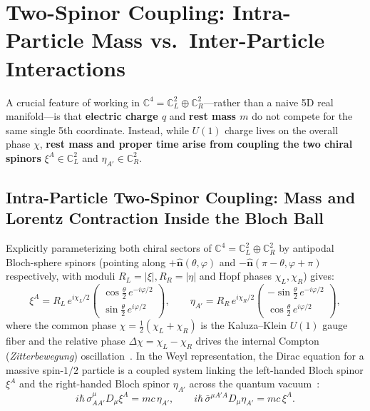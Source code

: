 \documentclass[11pt,a4paper]{article}
\begin{document}
\section{Two-Spinor Coupling: Intra-Particle Mass vs.\ Inter-Particle Interactions}

A crucial feature of working in $\mathbb{C}^4 = \mathbb{C}^2_L \oplus \mathbb{C}^2_R$---rather than a naive 5D real manifold---is that \textbf{electric charge $q$} and \textbf{rest mass $m$} do not compete for the same single 5th coordinate. Instead, while $U(1)$ charge lives on the overall phase $\chi$, \textbf{rest mass and proper time arise from coupling the two chiral spinors} $\xi^A \in \mathbb{C}^2_L$ and $\eta_{A'} \in \mathbb{C}^2_R$.

\subsection{Intra-Particle Two-Spinor Coupling: Mass and Lorentz Contraction Inside the Bloch Ball}
Explicitly parameterizing both chiral sectors of $\mathbb{C}^4 = \mathbb{C}^2_L \oplus \mathbb{C}^2_R$ by antipodal Bloch-sphere spinors (pointing along $+\hat{\mathbf{n}}(\theta,\varphi)$ and $-\hat{\mathbf{n}}(\pi-\theta,\varphi+\pi)$ respectively, with moduli $R_L = |\xi|, R_R = |\eta|$ and Hopf phases $\chi_L, \chi_R$) gives:
\[
\xi^A = R_L\, e^{i\chi_L / 2} \begin{pmatrix} \cos\frac{\theta}{2}\, e^{-i\varphi/2} \\ \sin\frac{\theta}{2}\, e^{i\varphi/2} \end{pmatrix}, \qquad \eta_{A'} = R_R\, e^{i\chi_R / 2} \begin{pmatrix} -\sin\frac{\theta}{2}\, e^{-i\varphi/2} \\ \cos\frac{\theta}{2}\, e^{i\varphi/2} \end{pmatrix},
\]
where the common phase $\chi = \frac{1}{2}(\chi_L + \chi_R)$ is the Kaluza--Klein $U(1)$ gauge fiber and the relative phase $\Delta\chi = \chi_L - \chi_R$ drives the internal Compton (\emph{Zitterbewegung}) oscillation~\cite{Dirac1928,PenroseRoad2004}. In the Weyl representation, the Dirac equation for a massive spin-$1/2$ particle is a coupled system linking the left-handed Bloch spinor $\xi^A$ and the right-handed Bloch spinor $\eta_{A'}$ across the quantum vacuum~\cite{Dirac1928,PenroseRindler1984}:
\begin{equation}
i\hbar\, \sigma^\mu_{AA'} D_\mu \xi^A = m c\, \eta_{A'}, \qquad i\hbar\, \bar{\sigma}^{\mu A'A} D_\mu \eta_{A'} = m c\, \xi^A.
\end{equation}
\end{document}
